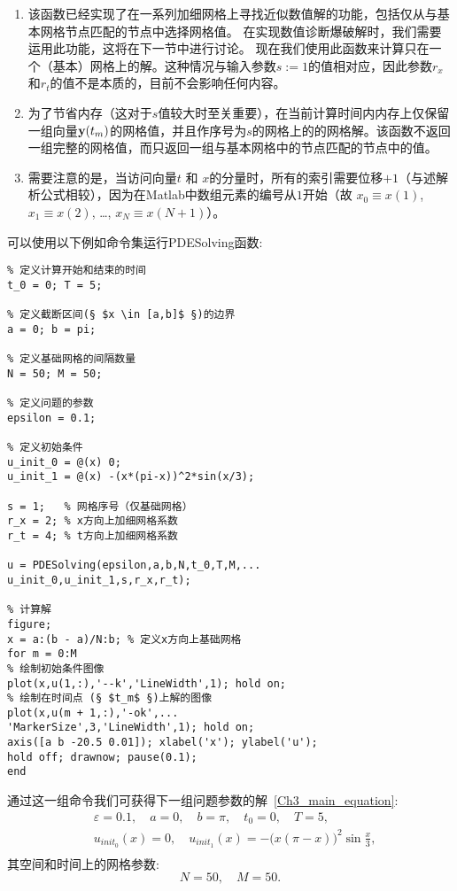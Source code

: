\documentclass[twoside]{book}
\def\textbf{\bf}%
\begin{document}
\begin{CJK*}{GBK}{song}
	\begin{enumerate}
		\item 该函数已经实现了在一系列加细网格上寻找近似数值解的功能，包括仅从与基本网格节点匹配的节点中选择网格值。 在实现数值诊断爆破解时，我们需要运用此功能，这将在下一节中进行讨论。 现在我们使用此函数来计算只在一个（基本）网格上的解。这种情况与输入参数$s:=1$的值相对应，因此参数$r_x$和$r_t$的值不是本质的，目前不会影响任何内容。
		\item 为了节省内存（这对于$s$值较大时至关重要），在当前计算时间内内存上仅保留一组向量$\emph{\textbf{y}}(t_m)$的网格值，并且作序号为$s$的网格上的的网格解。该函数不返回一组完整的网格值，而只返回一组与基本网格中的节点匹配的节点中的值。
		\item 需要注意的是，当访问向量$t$ 和 $x$的分量时，所有的索引需要位移$+1$（与述解析公式相较），因为在Matlab中数组元素的编号从$1$开始（故 $x_0 \equiv x(1)$, $x_1 \equiv x(2)$, \ldots, $x_N \equiv x(N + 1)$）。
	\end{enumerate}


     可以使用以下例如命令集运行PDESolving函数:

%
\begin{lstlisting}
% 定义计算开始和结束的时间
t_0 = 0; T = 5;

% 定义截断区间(§ $x \in [a,b]$ §)的边界
a = 0; b = pi;

% 定义基础网格的间隔数量
N = 50; M = 50;

% 定义问题的参数
epsilon = 0.1;

% 定义初始条件
u_init_0 = @(x) 0;
u_init_1 = @(x) -(x*(pi-x))^2*sin(x/3);

s = 1;   % 网格序号（仅基础网格）
r_x = 2; % x方向上加细网格系数
r_t = 4; % t方向上加细网格系数

u = PDESolving(epsilon,a,b,N,t_0,T,M,...
u_init_0,u_init_1,s,r_x,r_t);

% 计算解
figure;
x = a:(b - a)/N:b; % 定义x方向上基础网格
for m = 0:M
% 绘制初始条件图像
plot(x,u(1,:),'--k','LineWidth',1); hold on;
% 绘制在时间点 (§ $t_m$ §)上解的图像
plot(x,u(m + 1,:),'-ok',...
'MarkerSize',3,'LineWidth',1); hold on;
axis([a b -20.5 0.01]); xlabel('x'); ylabel('u');
hold off; drawnow; pause(0.1);
end
\end{lstlisting}


通过这一组命令我们可获得下一组问题参数的解~\eqref{Ch3_main_equation}:
\begin{equation}
\label{Ch_3_parameters_3_1_a}
\begin{aligned}
&\varepsilon = 0.1, \quad a = 0, \quad b = \pi, \quad t_0 = 0, \quad T = 5, \\
&u_{init_0}(x) = 0, \quad u_{init_1}(x) = -\big(x(\pi-x)\big)^2\sin\frac{x}{3}, \\
\end{aligned}
\end{equation}
其空间和时间上的网格参数:
\begin{equation}
\label{Ch_3_parameters_3_1_b}
N = 50, \quad M = 50.
\end{equation}



\end{CJK*}
\end{document}
